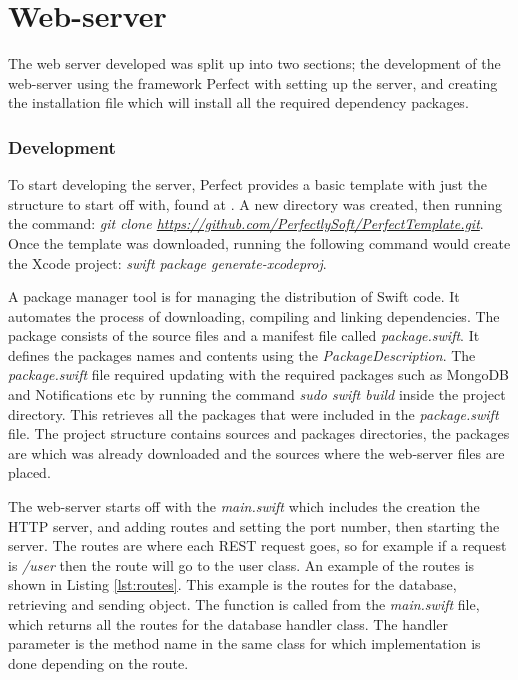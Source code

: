 \section{Web-server} \label{dev:webserver}

The web server developed was split up into two sections; the development of the web-server using the framework Perfect with setting up the server, and creating the installation file which will install all the required dependency packages.

\subsubsection{Development} \label{dev:ws_dev}

To start developing the server, Perfect provides a basic template with just the structure to start off with, found at . A new directory was created, then running the command: \textit{git clone \url{https://github.com/PerfectlySoft/PerfectTemplate.git}}. Once the template was downloaded, running the following command would create the Xcode project: \textit{swift package generate-xcodeproj}. 

A package manager tool is for managing the distribution of Swift code. It automates the process of downloading, compiling and linking dependencies. The package consists of the source files and a manifest file called \textit{package.swift}. It defines the packages names and contents using the \textit{PackageDescription}. \cite{swift_manager} The \textit{package.swift} file required updating with the required packages such as MongoDB and Notifications etc by running the command \textit{sudo swift build} inside the project directory. This retrieves all the packages that were included in the \textit{package.swift} file. The project structure contains sources and packages directories, the packages are which was already downloaded and the sources where the web-server files are placed. 

The web-server starts off with the \textit{main.swift} which includes the creation the HTTP server, and adding routes and setting the port number, then starting the server. The routes are where each REST request goes, so for example if a request is \textit{/user} then the route will go to the user class. An example of the routes is shown in Listing \ref{lst:routes}. This example is the routes for the database, retrieving and sending object. The function is called from the \textit{main.swift} file, which returns all the routes for the database handler class. The handler parameter is the method name in the same class for which implementation is done depending on the route.

